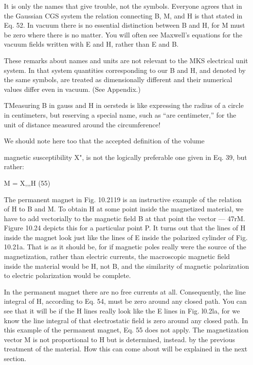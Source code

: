 {{It is only the names that give trouble, not the symbols. Everyone
agrees that in the Gaussian CGS system the relation connecting B,
M, and H is that stated in Eq. 52. In vacuum there is no essential
distinction between B and H, for M must be zero where there is no
matter. You will often see Maxwell's equations for the vacuum fields
written with E and H, rather than E and B.

These remarks about names and units are not relevant to the MKS
electrical unit system. In that system quantities corresponding to
our B and H, and denoted by the same symbols, are treated as
dimensionally different and their numerical values differ even in
vacuum. (See Appendix.)

TMeasuring B in gauss and H in oersteds is like expressing the radius of a circle in
centimeters, but reserving a special name, such as ``are centimeter,'' for the unit of distance
measured around the circumference!

We should note here too that the accepted definition of the volume

magnetic susceptibility X", is not the logically preferable one given
in Eq. 39, but rather:

M = X,,,H (55)

The permanent magnet in Fig. 10.2119 is an instructive example
of the relation of H to B and M. To obtain H at some point inside
the magnetized material, we have to add vectorially to the magnetic
field B at that point the vector  --- 47rM. Figure 10.24 depicts this
for a particular point P. It turns out that the lines of H inside the
magnet look just like the lines of E inside the polarized cylinder of
Fig. 10.21a. That is as it should be, for if magnetic poles really were
the source of the magnetization, rather than electric currents, the
macroscopic magnetic field inside the material would be H, not B,
and the similarity of magnetic polarization to electric polarization
would be complete.

In the permanent magnet there are no free currents at all. 
Consequently, the line integral of H, according to Eq. 54, must be zero
around any closed path. You can see that it will be if the H lines
really look like the E lines in Fig. l0.2la, for we know the line integral
of that electrostatic field is zero around any closed path. In this
example of the permanent magnet, Eq. 55 does not apply. The
magnetization vector M is not proportional to H but is determined,
instead. by the previous treatment of the material. How this can
come about will be explained in the next section.

}}
